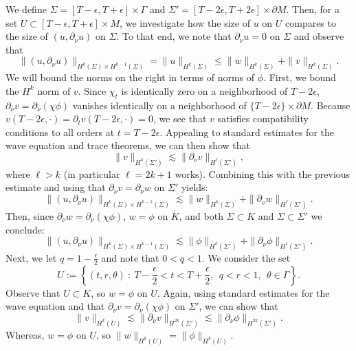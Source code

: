 \documentclass[final,leqno]{siamart1116}
\begin{document}
We define $\Sigma = [T-\epsilon,T+\epsilon] \times \Gamma$ and $\Sigma' =
[T-2\epsilon,T+2\epsilon] \times {\partial} M$. Then, for a set $U \subset
[T-\epsilon,T+\epsilon] \times M$, we investigate how the size of $u$
on $U$ compares to the size of $(u,{\partial}_\nu u)$ on $\Sigma$. To that
end, we note that ${\partial}_\nu u = 0$ on $\Sigma$ and observe that
\begin{equation*}
  \|(u,{\partial}_\nu u)\|_{H^k(\Sigma)\times H^{k-1}(\Sigma)} =
  \|u\|_{H^k(\Sigma)} \leq \|w\|_{H^k(\Sigma)} + \|v\|_{H^k(\Sigma)}.
\end{equation*}
We will bound the norms on the right in terms of norms of
$\phi$. First, we bound the $H^k$ norm of $v$. Since $\chi_t$ is
identically zero on a neighborhood of $T - 2\epsilon$, ${\partial}_\nu v =
{\partial}_\nu(\chi \phi)$ vanishes identically on a neighborhood of
$\{T-2\epsilon\} \times {\partial} M$. Because $v(T-2\epsilon, \cdot) = {\partial}_t
v(T-2\epsilon,\cdot) = 0$, we see that $v$ satisfies compatibility
conditions to all orders at $t = T-2\epsilon$. Appealing to standard
estimates for the wave equation and trace theorems, we can then show
that
\begin{equation*}
  \|v\|_{H^k(\Sigma')} \lesssim \|{\partial}_\nu v\|_{H^\ell(\Sigma')},
\end{equation*}
where $\ell > k$ (in particular $\ell = 2k+1$ works).  Combining this
with the previous estimate and using that ${\partial}_\nu v = {\partial}_\nu w$ on
$\Sigma'$ yields:
\begin{equation*}
  \|(u,{\partial}_\nu u)\|_{H^k(\Sigma) \times H^{k-1}(\Sigma)} \lesssim
  \|w\|_{H^k(\Sigma)} + \|{\partial}_\nu w\|_{H^\ell(\Sigma')}.
\end{equation*}
Then, since ${\partial}_\nu w = {\partial}_\nu (\chi \phi)$, $w = \phi$ on $K$, and
both $\Sigma \subset K$ and $\Sigma \subset \Sigma'$ we conclude:
\begin{equation*}
  \|(u,{\partial}_\nu u)\|_{H^k(\Sigma) \times H^{k-1}(\Sigma)} \lesssim
  \|\phi\|_{H^k(\Sigma')} + \|{\partial}_\nu \phi\|_{H^\ell(\Sigma')}.
\end{equation*}
Next, we let $q = 1 - \frac{\epsilon}{2}$ and note that $0 < q <
1$. We consider the set
\begin{equation*}
  U := \left\{(t,r,\theta)~:~T-\frac{\epsilon}{2} < t < T+\frac{\epsilon}{2},~~q < r < 1,~~\theta \in \Gamma\right\}.
\end{equation*}
Observe that $U \subset K$, so $w = \phi$ on $U$. Again, using
standard estimates for the wave equation and that ${\partial}_\nu v =
{\partial}_\nu(\chi \phi)$ on $\Sigma'$, we can show that
\begin{equation*}
  \|v\|_{H^k(U)} \lesssim \|{\partial}_\nu v\|_{H^{2k}(\Sigma')} \lesssim
  \|{\partial}_\nu \phi\|_{H^{2k}(\Sigma')}.  
\end{equation*}
Whereas, $w = \phi$ on $U$, so $\|w\|_{H^k(U)} = \|\phi\|_{H^k(U)}$.
\end{document}
